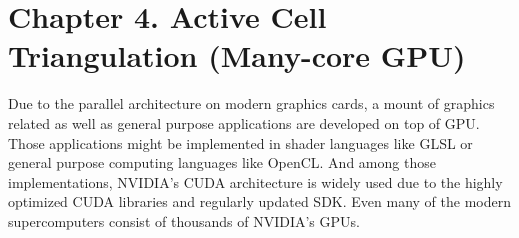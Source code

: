 \documentclass[11pt, b5paper]{report}
\begin{document}


% 
\chapter*{Chapter 4. Active Cell Triangulation (Many-core GPU)}
\setcounter{tocdepth}{0}
\setcounter{chapter}{4}
\setcounter{section}{0}
\label{ch:interp}

Due to the parallel architecture on modern graphics cards, a mount of 
graphics related as well as general purpose applications are developed on top 
of GPU. Those applications might be implemented in shader languages like GLSL 
or general purpose computing languages like OpenCL. And among those 
implementations, NVIDIA's CUDA architecture is widely used due to the highly
optimized CUDA libraries and regularly updated SDK. Even many of the modern
supercomputers consist of thousands of NVIDIA's GPUs.
\end{document}
